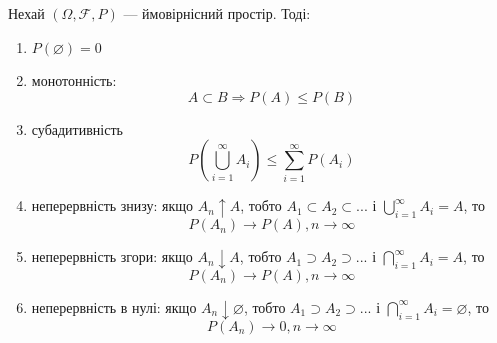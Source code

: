 \begin{theorem}
    Нехай $(\Omega, \mathcal{F}, P)$ --- ймовірнісний простір. Тоді:
    \begin{enumerate}
        \item $P(\varnothing) = 0$
        \item монотонність:
            $$A \subset B \Rightarrow P(A) \leqslant P(B)$$
        
        \item субадитивність
            $$P(\bigcup\limits_{i=1}^{\infty} A_i) \leqslant \sum\limits_{i=1}^{\infty} P(A_i)$$
        \item неперервність знизу:
            якщо $A_n \uparrow A$, тобто $A_1 \subset A_2 \subset ... $
            і $\bigcup_{i=1}^{\infty} A_i = A$, то
            $$P(A_n) \rightarrow P(A), n \rightarrow \infty$$
        \item неперервність згори:
            якщо $A_n \downarrow A$, тобто $A_1 \supset A_2 \supset ... $
            і $\bigcap_{i=1}^{\infty} A_i = A$, то
            $$P(A_n) \rightarrow P(A), n \rightarrow \infty$$
        \item неперервність в нулі:
            якщо $A_n \downarrow \varnothing$, тобто $A_1 \supset A_2 \supset ... $
            і $\bigcap_{i=1}^{\infty} A_i = \varnothing$, то
            $$P(A_n) \rightarrow 0, n \rightarrow \infty$$
    \end{enumerate}
\end{theorem}
